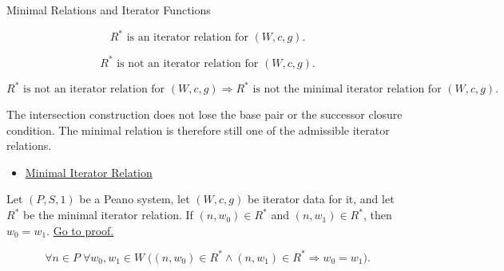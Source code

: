 \begin{topicbox}{Minimal Relations and Iterator Functions}
\begin{remark*}
\[
R^* \text{ is an iterator relation for } (W,c,g).
\]
\end{remark*}


\begin{remark*}
\[
R^* \text{ is not an iterator relation for } (W,c,g).
\]
\end{remark*}

\begin{remark*}
\[
R^* \text{ is not an iterator relation for } (W,c,g)
\Longrightarrow
R^* \text{ is not the minimal iterator relation for } (W,c,g).
\]
\end{remark*}

\begin{remark*}[Interpretation]
The intersection construction does not lose the base pair or the successor
closure condition. The minimal relation is therefore still one of the
admissible iterator relations.
\end{remark*}

\begin{remark*}[Dependencies]
\begin{itemize}
  \item \hyperref[def:minimal-iterator-relation]{Minimal Iterator Relation}
\end{itemize}
\end{remark*}

\begin{tcolorbox}[colback=lembox, colframe=lemborder, arc=2pt,
  left=6pt, right=6pt, top=4pt, bottom=4pt,
  title={\small\textbf{Lemma (Forced Values Are Unique)}},
  fonttitle=\small\bfseries]
\begin{lemma}
\label{lem:forced-values-are-unique}
Let $(P,S,1)$ be a Peano system, let $(W,c,g)$ be iterator data for it, and let
$R^*$ be the minimal iterator relation. If $(n,w_0)\in R^*$ and
$(n,w_1)\in R^*$, then $w_0=w_1$.
\hyperref[prf:forced-values-are-unique]{Go to proof.}
\end{lemma}
\end{tcolorbox}

\begin{remark*}
\[
\forall n\in P\;\forall w_0,w_1\in W\;
\bigl((n,w_0)\in R^*\land (n,w_1)\in R^*\Longrightarrow w_0=w_1\bigr).
\]
\end{remark*}


\end{topicbox}
